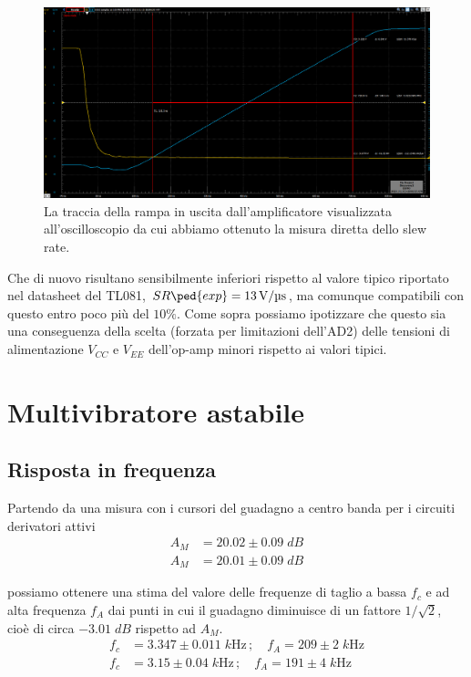 \documentclass[10pt,a4paper]{article}
\begin{document}
\begin{figure}[htbp]
\centering
\includegraphics[scale=0.37]{slew}
\caption{La traccia della rampa in uscita dall'amplificatore visualizzata
all'oscilloscopio da cui abbiamo ottenuto la misura diretta dello slew rate.
\label{fig: slewrate}}
\end{figure}

Che di nuovo risultano sensibilmente inferiori rispetto al valore tipico
riportato nel datasheet del TL081, $SR\ped{exp} = \SI{13}{\V/\micro\s}$,
ma comunque compatibili con questo entro poco più del $10\%$. Come sopra
possiamo ipotizzare che questo sia una conseguenza della scelta (forzata
per limitazioni dell'AD2) delle tensioni di alimentazione $V_{CC}$ e $V_{EE}$
dell'op-amp minori rispetto ai valori tipici.

\section{Multivibratore astabile}
\subsection{Risposta in frequenza}
Partendo da una misura con i cursori del guadagno a centro banda per i
circuiti derivatori attivi
\begin{align*}
A_M &= 20.02 \pm  0.09 \; \si{dB} \\
A_M &= 20.01 \pm  0.09 \; \si{dB}
\end{align*}

possiamo ottenere una stima del valore delle frequenze di taglio a bassa
$f_c$ e ad alta frequenza $f_A$ dai punti in cui il guadagno diminuisce di un
fattore $1/\sqrt{2}$, cioè di circa $-3.01 \; \si{dB}$ rispetto ad $A_M$.
\begin{align*}
f_c &= 3.347 \pm 0.011 \; \si{k\Hz} \, ; \quad f_A = 209 \pm 2 \; \si{k\Hz} \\
f_c &= 3.15 \pm 0.04 \; \si{k\Hz} \, ; \quad f_A = 191 \pm 4 \; \si{k\Hz}
\end{align*}
\end{document}
